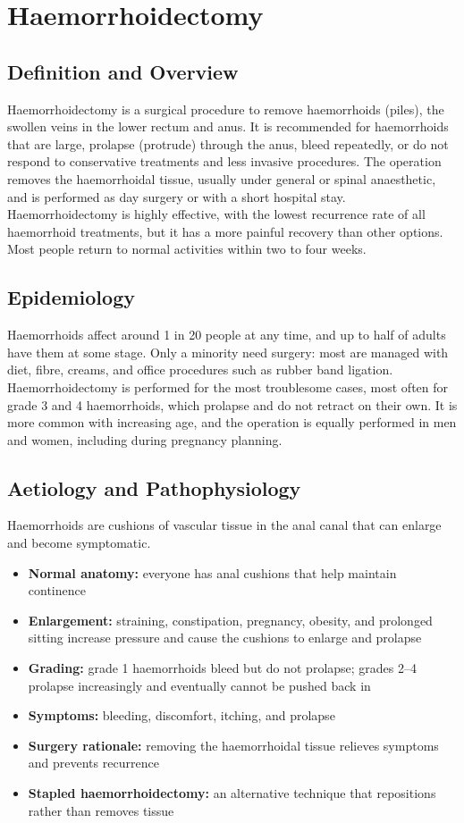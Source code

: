 \chapter{Haemorrhoidectomy}

\section*{Definition and Overview}
Haemorrhoidectomy is a surgical procedure to remove haemorrhoids (piles), the swollen veins in the lower rectum and anus. It is recommended for haemorrhoids that are large, prolapse (protrude) through the anus, bleed repeatedly, or do not respond to conservative treatments and less invasive procedures. The operation removes the haemorrhoidal tissue, usually under general or spinal anaesthetic, and is performed as day surgery or with a short hospital stay. Haemorrhoidectomy is highly effective, with the lowest recurrence rate of all haemorrhoid treatments, but it has a more painful recovery than other options. Most people return to normal activities within two to four weeks.

\section*{Epidemiology}
Haemorrhoids affect around 1 in 20 people at any time, and up to half of adults have them at some stage. Only a minority need surgery: most are managed with diet, fibre, creams, and office procedures such as rubber band ligation. Haemorrhoidectomy is performed for the most troublesome cases, most often for grade 3 and 4 haemorrhoids, which prolapse and do not retract on their own. It is more common with increasing age, and the operation is equally performed in men and women, including during pregnancy planning.

\section*{Aetiology and Pathophysiology}
Haemorrhoids are cushions of vascular tissue in the anal canal that can enlarge and become symptomatic.

\begin{itemize}
    \item \textbf{Normal anatomy:} everyone has anal cushions that help maintain continence
    \item \textbf{Enlargement:} straining, constipation, pregnancy, obesity, and prolonged sitting increase pressure and cause the cushions to enlarge and prolapse
    \item \textbf{Grading:} grade 1 haemorrhoids bleed but do not prolapse; grades 2--4 prolapse increasingly and eventually cannot be pushed back in
    \item \textbf{Symptoms:} bleeding, discomfort, itching, and prolapse
    \item \textbf{Surgery rationale:} removing the haemorrhoidal tissue relieves symptoms and prevents recurrence
    \item \textbf{Stapled haemorrhoidectomy:} an alternative technique that repositions rather than removes tissue
\end{itemize}

